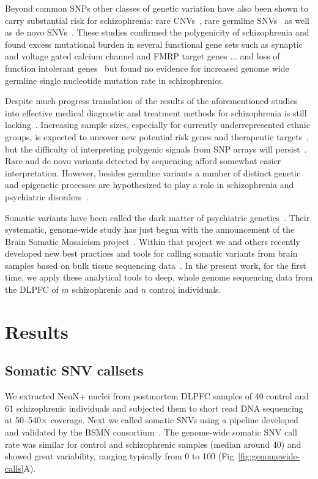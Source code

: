\documentclass[letterpaper]{article}
\begin{document}
Beyond common SNPs other classes of genetic variation have also been shown to
carry substantial risk for schizophrenia: rare CNVs~\citep{Rees2014}, rare germline
SNVs~\citep{Purcell2014,Singh2017} as well as de novo
SNVs~\citep{Fromer2014,Rees2020}.  These studies confirmed the polygenicity of
schizophrenia and found excess mutational burden in several functional
gene sets such as synaptic and voltage gated calcium channel and FMRP target
genes\citep{Fromer2014,Purcell2014} ... and loss of function intolerant
genes~\citep{Rees2020,Singh2017} but found no evidence for increased genome
wide germline single nucleotide mutation rate in schizophrenics.

Despite much progress translation of the results of the aforementioned studies
into effective medical diagnostic and treatment methods for schizophrenia is
still lacking~\citep{Breen2016,Foley2017}. Increasing sample sizes, especially
for currently underrepresented ethnic groups, is expected to uncover new
potential risk genes and therapeutic targets~\citep{Visscher2017}, but the difficulty of interpreting
polygenic signals from SNP arrays will persist~\citep{Boyle2017}.  Rare and de
novo variants detected by sequencing afford somewhat easier interpretation.
However, besides germline variants a number of distinct genetic and epigenetic
processes are hypothesized to play a role in schizophrenia and psychiatric
disorders~\citep{PsychENCODEConsortium2015}.

Somatic variants have been called the dark matter of psychiatric
genetics~\citep{Insel2014}.  Their systematic, genome-wide study has just begun
with the announcement of the Brain Somatic Mosaicism
project~\citep{McConnell2017}.  Within that project we and others recently
developed new best practices and tools for calling somatic variants from brain
samples based on bulk tissue sequencing data~\citep{Wang2021}.  In the present
work, for the first time, we apply these analytical tools to deep, whole
genome sequencing data from the DLPFC of \(m\) schizophrenic and \(n\) control
individuals.

\section*{Results}

\subsection*{Somatic SNV callsets}

We extracted NeuN+ nuclei from postmortem DLPFC samples of 40 control
and 61 schizophrenic individuals and subjected them to short read DNA
sequencing at 50--540\(\times\) coverage.  Next we called somatic SNVs using a
pipeline developed and validated by the BSMN consortium~\citep{Wang2021}.  The
genome-wide somatic SNV call rate was similar for control and schizophrenic
samples (median around 40) and showed great variability, ranging typically
from 0 to 100
(Fig~\ref{fig:genomewide-calls}A).
\end{document}
